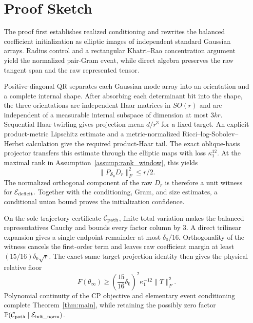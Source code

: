 \section{Proof Sketch}\label{sec:proof-sketch}

The proof first establishes realized conditioning and rewrites the balanced
coefficient initialization as elliptic images of independent standard
Gaussian arrays.  Radius control and a rectangular Khatri--Rao concentration
argument yield the normalized pair-Gram event, while direct algebra preserves
the raw tangent span and the raw represented tensor.

Positive-diagonal QR separates each Gaussian mode array into an orientation
and a complete internal shape.  After absorbing each determinant bit into the
shape, the three orientations are independent Haar matrices in $SO(r)$ and are
independent of a measurable internal subspace of dimension at most $3kr$.
Sequential Haar twirling gives projection mean $d/r^3$ for a fixed target.
An explicit product-metric Lipschitz estimate and a metric-normalized
Ricci--log-Sobolev--Herbst calculation give the required product-Haar tail.
The exact oblique-basis projector transfers this estimate through the elliptic
maps with loss $\kappa_1^{12}$.  At the maximal rank in
Assumption~\ref{assump:rank_window}, this yields
\[
  \|P_{\mathscr S_0}D_r\|_F^2\le r/2.
\]
The normalized orthogonal component of the raw $D_r$ is therefore a unit
witness for $\mathcal E_{\rm deficit}$.  Together with the conditioning, Gram,
and size estimates, a conditional union bound proves the initialization
confidence.

On the sole trajectory certificate $\mathcal C_{\rm path}$, finite total
variation makes the balanced representatives Cauchy and bounds every factor
column by $3$.  A direct trilinear expansion gives a single endpoint remainder
at most $\delta_0/16$.  Orthogonality of the witness cancels the first-order
term and leaves raw coefficient margin at least
$(15/16)\delta_0\sqrt r$.  The exact same-target projection identity then
gives the physical relative floor
\[
  F(\theta_\infty)
  \ge\left(\frac{15}{16}\delta_0\right)^2
       \kappa_1^{-12}\|T\|_F^2.
\]
Polynomial continuity of the CP objective and elementary event conditioning
complete Theorem~\ref{thm:main}, while retaining the possibly zero factor
$\mathbb P(\mathcal C_{\rm path}\mid\mathcal E_{\rm init\_norm})$.
